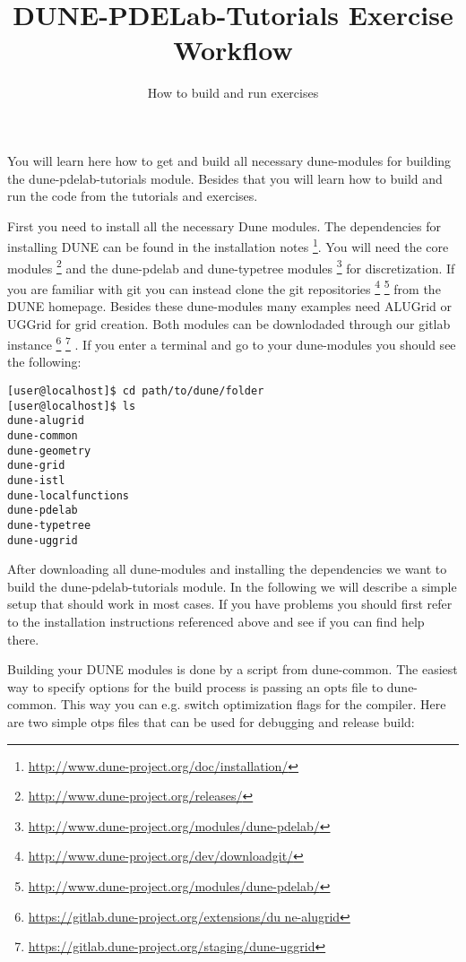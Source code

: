 \documentclass[12pt,a4paper]{article}
\title{\textbf{DUNE-PDELab-Tutorials Exercise Workflow}}
\subtitle{How to build and run exercises}
\begin{document}
\exerciseheader

You will learn here how to get and build all necessary dune-modules
for building the dune-pdelab-tutorials module.  Besides that you will
learn how to build and run the code from the tutorials and exercises.

First you need to install all the necessary Dune modules.  The
dependencies for installing DUNE can be found in the installation
notes
\footnote{\href{http://www.dune-project.org/doc/installation/}{http://www.dune-project.org/doc/installation/}}.
You will need the core modules
\footnote{\href{http://www.dune-project.org/releases/}{http://www.dune-project.org/releases/}}
and the dune-pdelab and dune-typetree modules
\footnote{\href{http://www.dune-project.org/modules/dune-pdelab/}{http://www.dune-project.org/modules/dune-pdelab/}}
for discretization.  If you are familiar with git you can instead
clone the git repositories
\footnote{\href{http://www.dune-project.org/dev/downloadgit}{http://www.dune-project.org/dev/downloadgit/}}
\footnote{\href{http://www.dune-project.org/modules/dune-pdelab/}{http://www.dune-project.org/modules/dune-pdelab/}}
from the DUNE homepage.  Besides these dune-modules many examples need
ALUGrid or UGGrid for grid creation.  Both modules can be downlodaded
through our gitlab instance
\footnote{\href{https://gitlab.dune-project.org/extensions/dune-alugrid}{https://gitlab.dune-project.org/extensions/du
ne-alugrid}}
\footnote{\href{https://gitlab.dune-project.org/staging/dune-uggrid}{https://gitlab.dune-project.org/staging/dune-uggrid}}
. If you enter a terminal and go to your dune-modules you should see
the following:
\lstset{language=bash} %
\begin{lstlisting}
[user@localhost]$ cd path/to/dune/folder
[user@localhost]$ ls
dune-alugrid
dune-common
dune-geometry
dune-grid
dune-istl
dune-localfunctions
dune-pdelab
dune-typetree
dune-uggrid
\end{lstlisting}

After downloading all dune-modules and installing the dependencies we
want to build the dune-pdelab-tutorials module.  In the following we
will describe a simple setup that should work in most cases.  If you
have problems you should first refer to the installation instructions
referenced above and see if you can find help there.

Building your DUNE modules is done by a script from dune-common.  The
easiest way to specify  options for the build process is passing an
opts file to dune-common.  This way you can e.g. switch optimization
flags for the compiler.  Here are two simple otps files that can be
used for debugging and release build:
\end{document}
